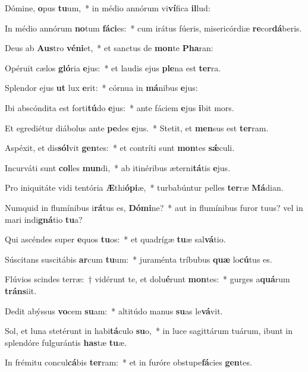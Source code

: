 \item Dómine, \textbf{o}pus \textbf{tu}um,~* in médio annórum vi\textbf{ví}fica \textbf{il}lud:
\item In médio annórum \textbf{no}tum \textbf{fá}\textbf{ci}es:~* cum irátus fúeris, misericórdiæ \textbf{re}cor\textbf{dá}beris.
\item Deus ab \textbf{Aus}tro \textbf{vé}\textbf{ni}et,~* et sanctus de \textbf{mon}te \textbf{Pha}ran:
\item Opéruit cælos \textbf{gló}ria \textbf{e}jus:~* et laudis ejus \textbf{ple}na est \textbf{ter}ra.
\item Splendor ejus \textbf{ut} lux \textbf{e}rit:~* córnua in \textbf{má}nibus \textbf{e}jus:
\item Ibi abscóndita est forti\textbf{tú}do \textbf{e}jus:~* ante fáciem \textbf{e}jus \textbf{i}bit mors.
\item Et egrediétur diábolus ante \textbf{pe}des \textbf{e}jus.~* Stetit, et \textbf{men}sus est \textbf{ter}ram.
\item Aspéxit, et dis\textbf{sól}vit \textbf{gen}tes:~* et contríti sunt \textbf{mon}tes \textbf{sǽ}culi.
\item Incurváti sunt \textbf{col}les \textbf{mun}di,~* ab itinéribus æterni\textbf{tá}tis \textbf{e}jus.
\item Pro iniquitáte vidi tentória \textbf{Æ}thi\textbf{ó}\textbf{pi}æ,~* turbabúntur pelles \textbf{ter}ræ \textbf{Má}dian.
\item Numquid in flumínibus i\textbf{rá}tus es, \textbf{Dó}\textbf{mi}ne?~* aut in flumínibus furor tuus? vel in mari indi\textbf{gná}tio \textbf{tu}a?
\item Qui ascéndes super \textbf{e}quos \textbf{tu}os:~* et quadrígæ \textbf{tu}æ sal\textbf{vá}tio.
\item Súscitans suscitábis \textbf{ar}cum \textbf{tu}um:~* juraménta tríbubus \textbf{quæ} lo\textbf{cú}tus es.
\item Flúvios scindes terræ:~† vidérunt te, et dolu\textbf{é}runt \textbf{mon}tes:~* gurges a\textbf{quá}rum \textbf{tráns}iit.
\item Dedit abýssus \textbf{vo}cem \textbf{su}am:~* altitúdo manus \textbf{su}as le\textbf{vá}vit.
\item Sol, et luna stetérunt in habi\textbf{tá}culo \textbf{su}o,~* in luce sagittárum tuárum, ibunt in splendóre fulgurántis \textbf{has}tæ \textbf{tu}æ.
\item In frémitu concul\textbf{cá}bis \textbf{ter}ram:~* et in furóre obstupe\textbf{fá}cies \textbf{gen}tes.
